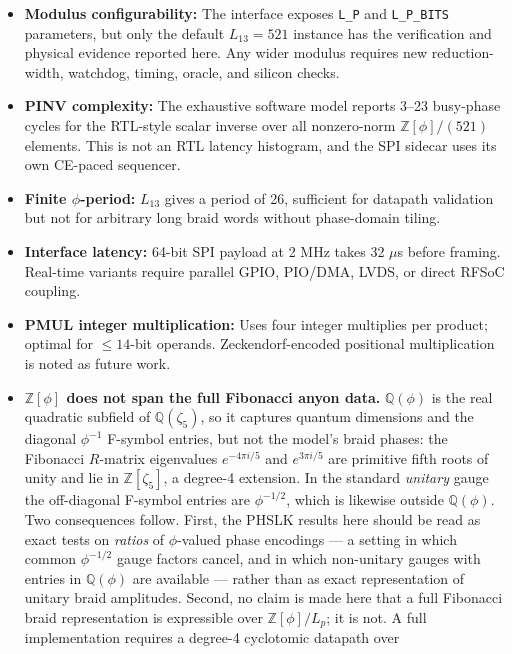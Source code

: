 \documentclass[conference]{IEEEtran}
\begin{document}
\begin{itemize}
    \item \textbf{Modulus configurability:} The interface exposes
    \texttt{L\_P} and \texttt{L\_P\_BITS} parameters, but only the default
    $L_{13}=521$ instance has the verification and physical evidence reported
    here. Any wider modulus requires new reduction-width, watchdog, timing,
    oracle, and silicon checks.
    \item \textbf{PINV complexity:} The exhaustive software model reports
    3--23 busy-phase cycles for the RTL-style scalar inverse over all
    nonzero-norm $\mathbb{Z}[\phi]/(521)$ elements. This is not an RTL latency histogram, and
    the SPI sidecar uses its own CE-paced sequencer.
    \item \textbf{Finite $\phi$-period:} $L_{13}$ gives a period of 26, sufficient for datapath validation but not for arbitrary long braid words without phase-domain tiling.
    \item \textbf{Interface latency:} 64-bit SPI payload at 2 MHz takes 32 $\mu$s before framing. Real-time variants require parallel GPIO, PIO/DMA, LVDS, or direct RFSoC coupling.
    \item \textbf{PMUL integer multiplication:} Uses four integer multiplies per product; optimal for $\le14$-bit operands. Zeckendorf-encoded positional multiplication is noted as future work.
    \item \textbf{$\mathbb{Z}[\phi]$ does not span the full Fibonacci anyon
    data.} $\mathbb{Q}(\phi)$ is the real quadratic subfield of
    $\mathbb{Q}(\zeta_5)$, so it captures quantum dimensions and the diagonal
    $\phi^{-1}$ F-symbol entries, but not the model's braid phases: the
    Fibonacci $R$-matrix eigenvalues $e^{-4\pi i/5}$ and $e^{3\pi i/5}$ are
    primitive fifth roots of unity and lie in $\mathbb{Z}[\zeta_5]$, a degree-4
    extension. In the standard \emph{unitary} gauge the off-diagonal F-symbol
    entries are $\phi^{-1/2}$, which is likewise outside
    $\mathbb{Q}(\phi)$. Two consequences follow. First, the PHSLK results here
    should be read as exact tests on \emph{ratios} of $\phi$-valued phase
    encodings --- a setting in which common $\phi^{-1/2}$ gauge factors cancel,
    and in which non-unitary gauges with entries in $\mathbb{Q}(\phi)$ are
    available --- rather than as exact representation of unitary braid
    amplitudes. Second, no claim is made here that a full Fibonacci braid
    representation is expressible over $\mathbb{Z}[\phi]/L_p$; it is not. A
    full implementation requires a degree-4 cyclotomic datapath over

\end{itemize}
\end{document}
